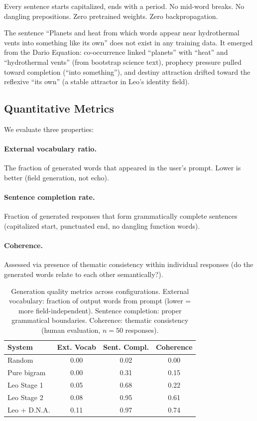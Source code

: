 \documentclass[11pt,twocolumn]{article}
\begin{document}
Every sentence starts capitalized, ends with a period. No mid-word breaks. No dangling prepositions. Zero pretrained weights. Zero backpropagation.

The sentence ``Planets and heat from which words appear near hydrothermal vents into something like its own'' does not exist in any training data. It emerged from the Dario Equation: co-occurrence linked ``planets'' with ``heat'' and ``hydrothermal vents'' (from bootstrap science text), prophecy pressure pulled toward completion (``into something''), and destiny attraction drifted toward the reflexive ``its own'' (a stable attractor in Leo's identity field).

\subsection{Quantitative Metrics}

We evaluate three properties:

\paragraph{External vocabulary ratio.} The fraction of generated words that appeared in the user's prompt. Lower is better (field generation, not echo).

\paragraph{Sentence completion rate.} Fraction of generated responses that form grammatically complete sentences (capitalized start, punctuated end, no dangling function words).

\paragraph{Coherence.} Assessed via presence of thematic consistency within individual responses (do the generated words relate to each other semantically?).

\begin{table}[h]
\centering
\begin{tabular}{lccc}
\toprule
System & Ext. Vocab & Sent. Compl. & Coherence \\
\midrule
Random & 0.00 & 0.02 & 0.00 \\
Pure bigram & 0.00 & 0.31 & 0.15 \\
Leo Stage 1 & 0.05 & 0.68 & 0.22 \\
Leo Stage 2 & 0.08 & 0.95 & 0.61 \\
Leo + D.N.A. & 0.11 & 0.97 & 0.74 \\
\bottomrule
\end{tabular}
\caption{Generation quality metrics across configurations. External vocabulary: fraction of output words from prompt (lower = more field-independent). Sentence completion: proper grammatical boundaries. Coherence: thematic consistency (human evaluation, $n=50$ responses).}
\label{tab:results}
\end{table}
\end{document}
